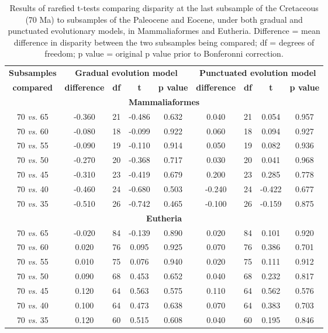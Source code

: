 \documentclass[12pt,letterpaper]{article}
\begin{document}
\begin{table}[ht]
\caption{\scriptsize{Results of rarefied t-tests comparing disparity at the last subsample of the Cretaceous (70 Ma) to subsamples of the Paleocene and Eocene, under both gradual and punctuated evolutionary models, in Mammaliaformes and Eutheria. Difference = mean difference in disparity between the two subsamples being compared; df = degrees of freedom; p value = original p value prior to Bonferonni correction.}}
\label{tab:Tab_beck}
\centering
\begin{tabular}{c|cccc|cccc}
  \hline
  \textbf{Subsamples} & \multicolumn{4}{c|}{\textbf{Gradual evolution model}} & \multicolumn{4}{c}{\textbf{Punctuated evolution model}} \\
  \textbf{compared} & \textbf{difference} & \textbf{df} & \textbf{t} & \textbf{p value} & \textbf{difference} & \textbf{df} & \textbf{t} & \textbf{p value} \\ 
  \hline
  \multicolumn{9}{c}{\textbf{Mammaliaformes}}\\
  \hline
  70 \textit{vs.} 65 & -0.360 & 21 & -0.486 & 0.632 & 0.040 & 21 & 0.054 & 0.957 \\ 
  70 \textit{vs.} 60 & -0.080 & 18 & -0.099 & 0.922 & 0.060 & 18 & 0.094 & 0.927 \\ 
  70 \textit{vs.} 55 & -0.090 & 19 & -0.110 & 0.914 & 0.050 & 19 & 0.082 & 0.936 \\ 
  70 \textit{vs.} 50 & -0.270 & 20 & -0.368 & 0.717 & 0.030 & 20 & 0.041 & 0.968 \\ 
  70 \textit{vs.} 45 & -0.310 & 23 & -0.419 & 0.679 & 0.200 & 23 & 0.285 & 0.778 \\ 
  70 \textit{vs.} 40 & -0.460 & 24 & -0.680 & 0.503 & -0.240 & 24 & -0.422 & 0.677 \\ 
  70 \textit{vs.} 35 & -0.510 & 26 & -0.742 & 0.465 & -0.100 & 26 & -0.159 & 0.875 \\ 
  \hline
  \multicolumn{9}{c}{\textbf{Eutheria}}\\
  \hline
  70 \textit{vs.} 65 & -0.020 & 84 & -0.139 & 0.890 & 0.020 & 84 & 0.101 & 0.920 \\ 
  70 \textit{vs.} 60 & 0.020 & 76 & 0.095 & 0.925 & 0.070 & 76 & 0.386 & 0.701 \\ 
  70 \textit{vs.} 55 & 0.010 & 75 & 0.076 & 0.940 & 0.020 & 75 & 0.111 & 0.912 \\ 
  70 \textit{vs.} 50 & 0.090 & 68 & 0.453 & 0.652 & 0.040 & 68 & 0.232 & 0.817 \\ 
  70 \textit{vs.} 45 & 0.120 & 64 & 0.563 & 0.575 & 0.110 & 64 & 0.562 & 0.576 \\ 
  70 \textit{vs.} 40 & 0.100 & 64 & 0.473 & 0.638 & 0.070 & 64 & 0.383 & 0.703 \\ 
  70 \textit{vs.} 35 & 0.120 & 60 & 0.515 & 0.608 & 0.040 & 60 & 0.195 & 0.846 \\ 
   \hline
\end{tabular}
\end{table}
\end{document}
